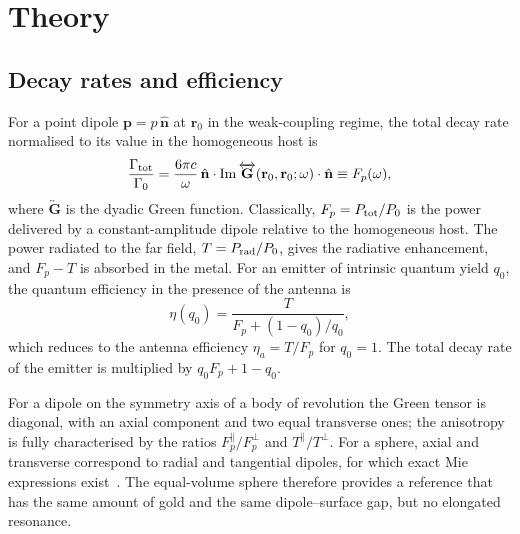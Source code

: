 \documentclass[11pt,a4paper]{article}
\newcommand{\Fp}{F_p}
\begin{document}
\section{Theory}

\subsection{Decay rates and efficiency}
For a point dipole $\mathbf{p}=p\,\hat{\mathbf n}$ at $\mathbf r_0$ in the weak-coupling regime, the total decay
rate normalised to its value in the homogeneous host is~\cite{novotny}
\begin{equation}
  \frac{\Gamma_{\rm tot}}{\Gamma_0} = \frac{6\pi c}{\omega}\,
  \hat{\mathbf n}\cdot\mathrm{Im}\,\overleftrightarrow{\mathbf G}(\mathbf r_0,\mathbf r_0;\omega)\cdot\hat{\mathbf n}
  \equiv \Fp(\omega),
  \label{eq:ldos}
\end{equation}
where $\overleftrightarrow{\mathbf G}$ is the dyadic Green function. Classically, $\Fp=P_{\rm tot}/P_0$ is the
power delivered by a constant-amplitude dipole relative to the homogeneous host. The power radiated to the far
field, $T=P_{\rm rad}/P_0$, gives the radiative enhancement, and $\Fp-T$ is absorbed in the metal. For an emitter
of intrinsic quantum yield $q_0$, the quantum efficiency in the presence of the antenna is~\cite{bharadwaj2007}
\begin{equation}
  \eta(q_0) = \frac{T}{\Fp + (1-q_0)/q_0},
  \label{eq:eta}
\end{equation}
which reduces to the antenna efficiency $\eta_a=T/\Fp$ for $q_0=1$. The total decay rate of the emitter is
multiplied by $q_0\Fp+1-q_0$.

For a dipole on the symmetry axis of a body of revolution the Green tensor is diagonal, with an axial component
and two equal transverse ones; the anisotropy is fully characterised by the ratios
$\Fp^{\parallel}/\Fp^{\perp}$ and $T^{\parallel}/T^{\perp}$. For a sphere, axial and transverse correspond to radial
and tangential dipoles, for which exact Mie expressions exist~\cite{ruppin,kim,mertens}. The equal-volume sphere
therefore provides a reference that has the same amount of gold and the same dipole--surface gap, but no
elongated resonance.
\end{document}
